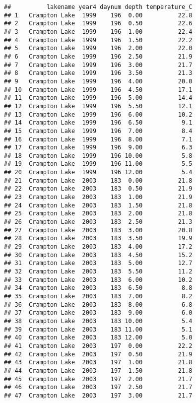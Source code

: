\documentclass[
]{article}
\begin{document}
\begin{verbatim}
##          lakename year4 daynum depth temperature_C
## 1   Crampton Lake  1999    196  0.00          22.8
## 2   Crampton Lake  1999    196  0.50          22.6
## 3   Crampton Lake  1999    196  1.00          22.4
## 4   Crampton Lake  1999    196  1.50          22.2
## 5   Crampton Lake  1999    196  2.00          22.0
## 6   Crampton Lake  1999    196  2.50          21.9
## 7   Crampton Lake  1999    196  3.00          21.7
## 8   Crampton Lake  1999    196  3.50          21.3
## 9   Crampton Lake  1999    196  4.00          20.0
## 10  Crampton Lake  1999    196  4.50          17.1
## 11  Crampton Lake  1999    196  5.00          14.4
## 12  Crampton Lake  1999    196  5.50          12.1
## 13  Crampton Lake  1999    196  6.00          10.2
## 14  Crampton Lake  1999    196  6.50           9.1
## 15  Crampton Lake  1999    196  7.00           8.4
## 16  Crampton Lake  1999    196  8.00           7.1
## 17  Crampton Lake  1999    196  9.00           6.3
## 18  Crampton Lake  1999    196 10.00           5.8
## 19  Crampton Lake  1999    196 11.00           5.5
## 20  Crampton Lake  1999    196 12.00           5.4
## 21  Crampton Lake  2003    183  0.00          21.8
## 22  Crampton Lake  2003    183  0.50          21.9
## 23  Crampton Lake  2003    183  1.00          21.9
## 24  Crampton Lake  2003    183  1.50          21.8
## 25  Crampton Lake  2003    183  2.00          21.8
## 26  Crampton Lake  2003    183  2.50          21.3
## 27  Crampton Lake  2003    183  3.00          20.8
## 28  Crampton Lake  2003    183  3.50          19.9
## 29  Crampton Lake  2003    183  4.00          17.2
## 30  Crampton Lake  2003    183  4.50          15.2
## 31  Crampton Lake  2003    183  5.00          12.7
## 32  Crampton Lake  2003    183  5.50          11.2
## 33  Crampton Lake  2003    183  6.00          10.2
## 34  Crampton Lake  2003    183  6.50           8.8
## 35  Crampton Lake  2003    183  7.00           8.2
## 36  Crampton Lake  2003    183  8.00           6.8
## 37  Crampton Lake  2003    183  9.00           6.0
## 38  Crampton Lake  2003    183 10.00           5.4
## 39  Crampton Lake  2003    183 11.00           5.1
## 40  Crampton Lake  2003    183 12.00           5.0
## 41  Crampton Lake  2003    197  0.00          22.2
## 42  Crampton Lake  2003    197  0.50          21.9
## 43  Crampton Lake  2003    197  1.00          21.8
## 44  Crampton Lake  2003    197  1.50          21.8
## 45  Crampton Lake  2003    197  2.00          21.7
## 46  Crampton Lake  2003    197  2.50          21.7
## 47  Crampton Lake  2003    197  3.00          21.7

\end{verbatim}
\end{document}
